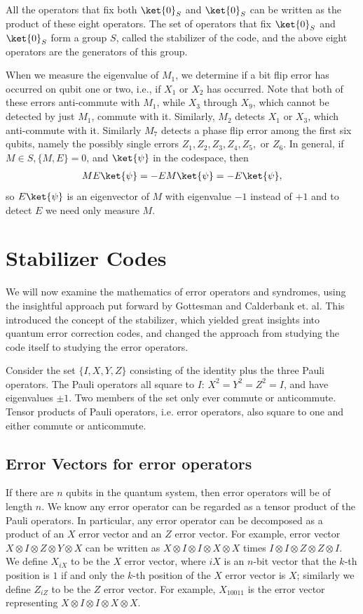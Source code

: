 All the operators that fix both \(\ket{0}_S\) and \(\ket{0}_S\) can be written as the product of these eight operators. The set of operators that fix \(\ket{0}_S\) and \(\ket{0}_S\) form a group \(S\), called the stabilizer of the code, and the above eight operators are the generators of this group.


When we measure the eigenvalue of \(M_1\), we determine if a bit flip error has occurred on qubit one or two, i.e., if \(X_1\) or \(X_2\) has occurred. Note that both of these errors anti-commute with \(M_1\), while \(X_3\) through \(X_9\), which cannot be detected by just \(M_1\), commute with it. Similarly, \(M_2\) detects \(X_1\) or \(X_3\), which anti-commute with it. Similarly \(M_7\) detects a phase flip error among the first six qubits, namely the possibly single errors  \(Z_1, Z_2, Z_3, Z_4, Z_5,\) or \(Z_6\). In general, if \(M \in S, \{M,E\} = 0\), and \(\ket{\psi}\) in the codespace, then
\begin{align*}
    ME \ket{\psi}  = - EM \ket{\psi} = -E\ket{\psi},
\end{align*}
so \(E \ket{\psi}\) is an eigenvector of \(M\) with eigenvalue \(-1\) instead of \(+1\) and to detect \(E\) we need only measure \(M\).

\section{Stabilizer Codes}
We will now examine the mathematics of error operators and syndromes, using the insightful approach put forward by Gottesman  and Calderbank et. al. This introduced the concept of the stabilizer, which yielded great insights into quantum error correction codes, and changed the approach from studying the code itself to studying the error operators. 

Consider the set \(\{I, X, Y, Z\}\) consisting of the identity plus the three Pauli operators. The Pauli operators all square to \(I\): \(X^2 = Y^2 = Z^2 = I\), and have eigenvalues \(\pm 1\). Two members of the set only ever commute  or anticommute. Tensor products of Pauli operators, i.e. error operators, also square to one and either commute or anticommute. 


\subsection{Error Vectors for error operators}
If there are \(n\) qubits in the quantum system, then error operators will be of length \(n\). We know any error operator can be regarded as a tensor product of the Pauli operators. In particular, any error operator can be decomposed as a product of an \(X\) error vector and an \(Z\) error vector. For example, error vector \(X\otimes I\otimes Z \otimes Y \otimes X\) can be written as \(X\otimes I\otimes I \otimes X \otimes X\) times \(I\otimes I\otimes Z \otimes Z \otimes I\). We define \(X_{iX}\) to be the \(X\) error vector, where \(iX\) is an \(n\)-bit vector that the \(k\)-th position is \(1\) if and only the \(k\)-th position of the \(X\) error vector is \(X\); similarly we define \(Z_{iZ}\) to be the \(Z\) error vector. For example, \(X_{10011}\) is the error vector representing \(X\otimes I\otimes I \otimes X \otimes X\).


